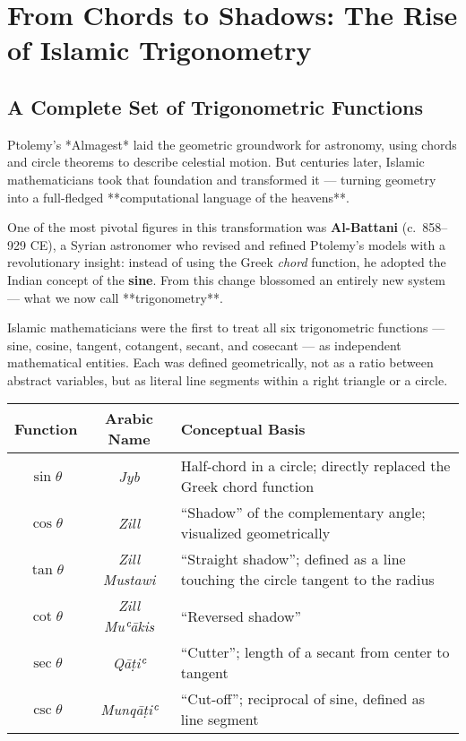 \section{From Chords to Shadows: The Rise of Islamic Trigonometry}


\subsection{A Complete Set of Trigonometric Functions}

Ptolemy’s *Almagest* laid the geometric groundwork for astronomy, using chords and circle theorems to describe celestial motion. But centuries later, Islamic mathematicians took that foundation and transformed it — turning geometry into a full-fledged **computational language of the heavens**.

One of the most pivotal figures in this transformation was \textbf{Al-Battani} (c.~858–929 CE), a Syrian astronomer who revised and refined Ptolemy’s models with a revolutionary insight: instead of using the Greek \textit{chord} function, he adopted the Indian concept of the \textbf{sine}. From this change blossomed an entirely new system — what we now call **trigonometry**.

Islamic mathematicians were the first to treat all six trigonometric functions — sine, cosine, tangent, cotangent, secant, and cosecant — as independent mathematical entities. Each was defined geometrically, not as a ratio between abstract variables, but as literal line segments within a right triangle or a circle.

\begin{center}
\renewcommand{\arraystretch}{1.4}
\begin{tabular}{|c|c|p{6cm}|}
\hline
\textbf{Function} & \textbf{Arabic Name} & \textbf{Conceptual Basis} \\
\hline
\( \sin \theta \) & \textit{Jyb}  & Half-chord in a circle; directly replaced the Greek chord function \\
\( \cos \theta \) & \textit{Zill}  & “Shadow” of the complementary angle; visualized geometrically \\
\( \tan \theta \) & \textit{Zill Mustawi}  & “Straight shadow”; defined as a line touching the circle tangent to the radius \\
\( \cot \theta \) & \textit{Zill Muʿākis}  & “Reversed shadow” \\
\( \sec \theta \) & \textit{Qāṭiʿ}  & “Cutter”; length of a secant from center to tangent \\
\( \csc \theta \) & \textit{Munqāṭiʿ} & “Cut-off”; reciprocal of sine, defined as line segment \\
\hline
\end{tabular}
\end{center}

